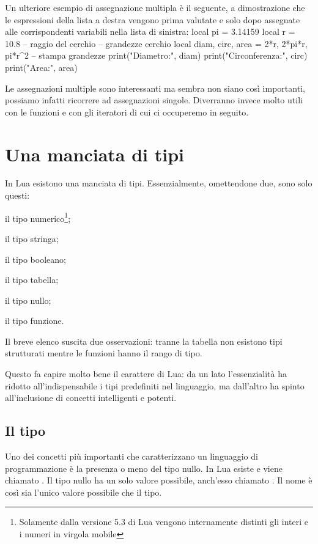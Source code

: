 Un ulteriore esempio di assegnazione multipla è il seguente, a dimostrazione
che le espressioni della lista a destra vengono prima valutate e solo dopo
assegnate alle corrispondenti variabili nella lista di sinistra:
\lines
local pi = 3.14159
local r = 10.8 -- raggio del cerchio
-- grandezze cerchio
local diam, circ, area = 2*r, 2*pi*r, pi*r^2
-- stampa grandezze
print("Diametro:", diam)
print("Circonferenza:", circ)
print("Area:", area)
\endlines
{}

Le assegnazioni multiple sono interessanti ma sembra non siano così importanti,
possiamo infatti ricorrere ad assegnazioni singole. Diverranno invece molto
utili con le funzioni e con gli iteratori di cui ci occuperemo in seguito.


\section{Una manciata di tipi}
\label{secFondManciataTipi}

In Lua esistono una manciata di tipi. Essenzialmente, omettendone due, sono solo
questi:
\begin{compactitemize}
\item {} il tipo numerico\footnote{Solamente dalla versione 5.3 di Lua
vengono internamente distinti gli interi e i numeri in virgola mobile};
\item {} il tipo stringa;
\item {} il tipo booleano;
\item {} il tipo tabella;
\item {} il tipo nullo;
\item {} il tipo funzione.
\end{compactitemize}

Il breve elenco suscita due osservazioni: tranne la tabella non esistono
tipi strutturati mentre le funzioni hanno il rango di tipo.

Questo fa capire molto bene il carattere di Lua: da un lato l'essenzialità ha
ridotto all'indispensabile i tipi predefiniti nel linguaggio, ma dall'altro ha
spinto all'inclusione di concetti intelligenti e potenti.


\subsection{Il tipo }

Uno dei concetti più importanti che caratterizzano un linguaggio di
programmazione è la presenza o meno del tipo nullo. In Lua esiste e viene
chiamato . Il tipo nullo ha un solo valore possibile, anch'esso
chiamato . Il nome è così sia l'unico valore possibile che il tipo.

